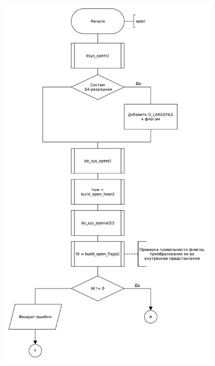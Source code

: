 \begin{figure}[H]
    \centering
    \caption{}
    \includegraphics[scale=0.5]{pdf/flowchart01.pdf}
\end{figure}
